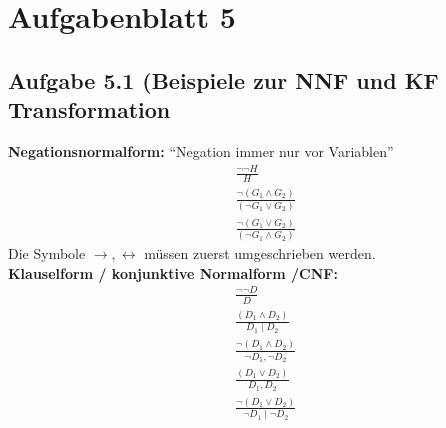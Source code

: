 
\section{Aufgabenblatt 5}
\subsection{Aufgabe 5.1 (Beispiele zur NNF und KF Transformation}
\textbf{Negationsnormalform:} ``Negation immer nur vor Variablen''\\
\begin{align}
	&\frac{\neg\neg H}{H}\label{Neg1}\\
	&\frac{\neg(G_1\wedge G_2)}{(\neg G_1\vee G_2)}\label{Neg2}\\
	&\frac{\neg(G_1\vee G_2)}{(\neg G_1\wedge G_2)}\label{Neg3}
\end{align}
Die Symbole $\to, \leftrightarrow$ müssen zuerst umgeschrieben werden.\\

\textbf{Klauselform / konjunktive Normalform /CNF:}\\
\begin{align}
	&\frac{\neg\neg D}{D}\label{KNF1}\tag{KNF1}\\
	&\frac{(D_1\wedge D_2)}{D_1\mid D_2}\label{KNF2}\tag{KNF2}\\
	&\frac{\neg(D_1\wedge D_2)}{\neg D_1,\neg D_2}\label{KNF3}\tag{KNF3}\\
	&\frac{(D_1\vee D_2)}{D_1, D_2}\label{KNF4}\tag{KNF4}\\
	&\frac{\neg(D_1\vee D_2)}{\neg D_1\mid\neg D_2}\label{KNF5}\tag{KNF5}\\
\end{align}

